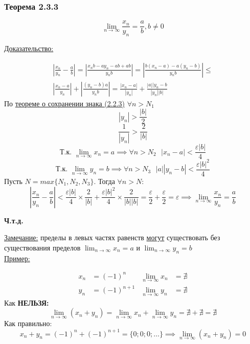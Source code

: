 \documentclass[12pt]{article}
\begin{document}
    \subsubsection*{Теорема 2.3.3}\label{th:2.3.3}
    \[ \lim_{n\to\infty}\frac{x_n}{y_n} = \frac{a}{b}, b \ne 0 \]\par\noindent
    \underline{Доказательство:}\par
    \begin{adjustwidth}{1.5em}{1.5em}
        \begin{gather*}
            \left|\frac{x_n}{y_n} - \frac{a}{b}\right| = \left|\frac{x_nb-ay_n-ab+ab}{y_nb}\right| = \left|\frac{b(x_n-a)-a(y_n-b)}{y_nb}\right| \le\\
            \left|\frac{x_n-a}{y_n}\right| + \left|\frac{(y_n-b)a}{y_nb}\right| = \frac{|x_n-a|}{|y_n|}+\frac{|a||y_n-b}{|y_n||b|}
        \end{gather*}
        По \hyperref[th:2.2.3]{теореме о сохранении знака (2.2.3)} $\forall n > N_{1}$
        \[|y_n| > \frac{|b|}{2}\]
        \[\frac{1}{|y_n|} > \frac{2}{|b|}\]
        \[\text{Т.к. }\lim_{n\to\infty}x_n = a \implies \forall n > N_{2} \text{ } |x_n - a| < \frac{\varepsilon|b|}{4}\]
        \[\text{Т.к. }\lim_{n\to\infty}y_n = b \implies \forall n > N_{3} \text{ } |a||y_n - b| < \frac{\varepsilon|b|^{2}}{4}\]
        Пусть $N = max\{N_{1}, N_{2}, N_{3}\}$. Тогда $\forall n > N$:
        \[ \left|\frac{x_n}{y_n} - \frac{a}{b}\right| < \frac{\varepsilon|b|}{4} \times \frac{2}{|b|} + \frac{\varepsilon|b|^{2}}{4} \times \frac{2}{|b||b|} = \frac{\varepsilon}{2} + \frac{\varepsilon}{2} = \varepsilon \implies \lim_{n\to\infty}\frac{x_n}{y_n} = \frac{a}{b} \]
        \begin{center}
            \textbf{Ч.т.д.}
        \end{center}
    \end{adjustwidth}
    \underline{Замечание:} пределы в левых частях равенств \underline{могут} существовать без существования пределов $\lim_{n\to\infty} x_n = a$ и $\lim_{n\to\infty} y_n = b$\\
    \underline{Пример:}
    \begin{adjustwidth}{1.5em}{1.5em}
        \begin{align*}
            x_n &= (-1)^n & \lim_{n\to\infty} x_n &= \nexists\\
            y_n &= (-1)^{n+1} & \lim_{n\to\infty} y_n &= \nexists
        \end{align*}
        Как \textbf{НЕЛЬЗЯ:}
        \[ \lim_{n\to\infty} (x_n + y_n) = \lim_{n\to\infty}x_n + \lim_{n\to\infty}y_n = \nexists + \nexists = \nexists \]
        Как правильно:
        \[ x_n + y_n = (-1)^n + (-1)^{n+1} = \{0;0;0;\dots\} \implies \lim_{n\to\infty}(x_n+y_n) = 0 \]
    \end{adjustwidth}
\end{document}
